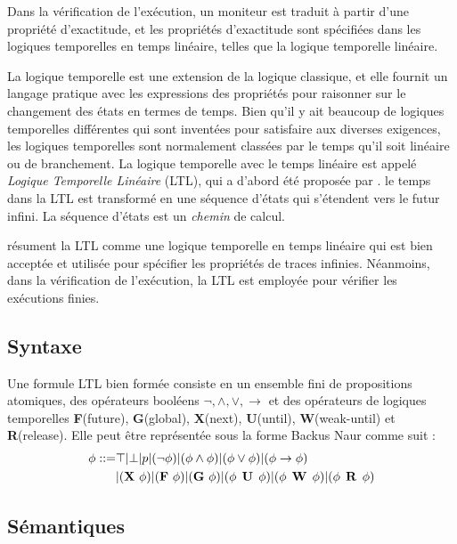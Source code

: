 Dans la vérification de l'exécution, un moniteur est traduit à partir d'une propriété d'exactitude, et les propriétés d'exactitude sont spécifiées dans les logiques temporelles en temps linéaire, telles que la logique temporelle linéaire.

La logique temporelle est une extension de la logique classique, et elle fournit un langage pratique avec les expressions des propriétés pour raisonner sur le changement des états en termes de temps. Bien qu'il y ait beaucoup de logiques temporelles différentes qui sont inventées pour satisfaire aux diverses exigences, les logiques temporelles sont normalement classées par le temps qu'il soit linéaire ou de branchement. La logique temporelle avec le temps linéaire est appelé \emph{Logique Temporelle Linéaire} (LTL), qui a d'abord été proposée par \cite{pnueli97}. le temps dans la LTL est transformé en une séquence d'états qui s'étendent vers le futur infini. La séquence d'états est un \emph{chemin} de calcul. \citep{clarke1999model,huth2004}

\cite{leucker2009brief} résument la LTL comme une logique temporelle en temps linéaire qui est bien acceptée et utilisée pour spécifier les propriétés de traces infinies. Néanmoins, dans la vérification de l'exécution, la LTL est employée pour vérifier les exécutions finies.

\subsection{Syntaxe}

Une formule LTL bien formée consiste en un ensemble fini de propositions atomiques, des opérateurs booléens $\neg, \wedge, \vee, \rightarrow$ et des opérateurs de logiques temporelles \textbf{F}(future), \textbf{G}(global), \textbf{X}(next), \textbf{U}(until), \textbf{W}(weak-until) et \textbf{R}(release). Elle peut être représentée sous la forme Backus Naur comme suit \citep{huth2004}:
\begin{align}
\phi ::= & \top | \bot | p | (\neg\phi) | (\phi \wedge \phi) | (\phi \vee \phi) | (\phi \rightarrow \phi) \nonumber \\
& | (\mathop{\mbox{\textbf{X}}}\, \phi) | (\mathop{\mbox{\textbf{F}}}\, \phi) | (\mathop{\mbox{\textbf{G}}}\, \phi) | (\phi \mathrel{\mbox{\,\textbf{U}}}\, \phi) | (\phi \mathrel{\mbox{\,\textbf{W}}}\, \phi) | (\phi \mathrel{\mbox{\,\textbf{R}}}\, \phi)
\end{align}

\subsection{Sémantiques}

